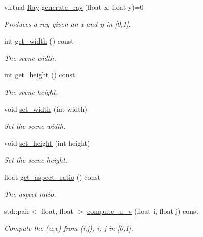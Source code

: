 \begin{DoxyCompactItemize}
\item 
virtual \mbox{\hyperlink{classomg_1_1_ray}{Ray}} \mbox{\hyperlink{classomg_1_1_camera_aca08c044082cb3573d606a8c851f52fe}{generate\+\_\+ray}} (float x, float y)=0
\begin{DoxyCompactList}\small\item\em Produces a ray given an x and y in \mbox{[}0,1\mbox{]}. \end{DoxyCompactList}\item 
int \mbox{\hyperlink{classomg_1_1_camera_a9d27ce6b9428503ad27e0247deb65bba}{get\+\_\+width}} () const
\begin{DoxyCompactList}\small\item\em The scene width. \end{DoxyCompactList}\item 
int \mbox{\hyperlink{classomg_1_1_camera_a4003f1cf690980d47b3307e6eefe3003}{get\+\_\+height}} () const
\begin{DoxyCompactList}\small\item\em The scene height. \end{DoxyCompactList}\item 
void \mbox{\hyperlink{classomg_1_1_camera_a3ef1ff0d4ca0deb6b32b5e08d7dcb159}{set\+\_\+width}} (int width)
\begin{DoxyCompactList}\small\item\em Set the scene width. \end{DoxyCompactList}\item 
void \mbox{\hyperlink{classomg_1_1_camera_a75d3baca3bae25365e5d3dddc005676e}{set\+\_\+height}} (int height)
\begin{DoxyCompactList}\small\item\em Set the scene height. \end{DoxyCompactList}\item 
float \mbox{\hyperlink{classomg_1_1_camera_ad9049467f7a5e4a3a089c789243b1463}{get\+\_\+aspect\+\_\+ratio}} () const
\begin{DoxyCompactList}\small\item\em The aspect ratio. \end{DoxyCompactList}\item 
std\+::pair$<$ float, float $>$ \mbox{\hyperlink{classomg_1_1_camera_a7978815c7f03689ea47eaf70065b4266}{compute\+\_\+u\+\_\+v}} (float i, float j) const
\begin{DoxyCompactList}\small\item\em Compute the (u,v) from (i,j), i, j in \mbox{[}0,1\mbox{]}. \end{DoxyCompactList}\item 

\end{DoxyCompactItemize}
